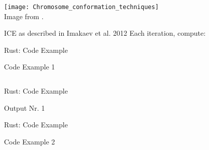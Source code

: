 \appendix
\backupbegin


\begin{frame}[c]%
    \normalsize
    \texttt{[image: Chromosome\_conformation\_techniques]} \\
    Image from \cite{Li2014}.
\end{frame}

\begin{frame}[c]{ICE as described in Imakaev et al. 2012 \cite{imakaev2012iterative}}
    \Large
    Each iteration, compute:
    \pause
    \vspace*{-\baselineskip}
\end{frame}



\begin{frame}[c]{Rust: Code Example}
    \begin{codeboxed}{Code Example 1}
    \inputminted[linenos, fontsize=\normalsize]{Rust}{code/code_ownership.rs}
    \end{codeboxed}
\end{frame}

\begin{frame}[c]{Rust: Code Example}
    \begin{codeboxed}{Output Nr. 1}
        \footnotesize
        
    \end{codeboxed}
\end{frame}

\begin{frame}[c]{Rust: Code Example}
    \begin{codeboxed}{Code Example 2}
    \inputminted[linenos, fontsize=\normalsize]{Rust}{code/code_ownership2.rs}
    \end{codeboxed}
\end{frame}

